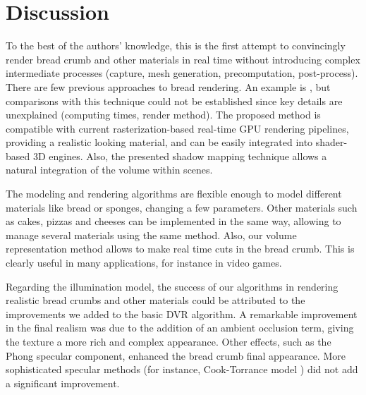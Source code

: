 
\section*{Discussion}


To the best of the authors' knowledge, this is the first attempt to convincingly render bread crumb and other materials in real time without introducing complex intermediate processes (capture, mesh generation, precomputation, post-process).
There are few previous approaches to bread rendering. An example is \cite{Cho2007}, but comparisons with this technique could not be established since key details are unexplained (computing times, render method).
The proposed method is compatible with current rasterization-based real-time GPU rendering pipelines, providing a realistic looking material, and can be easily integrated into  shader-based 3D engines.
Also, the presented shadow mapping technique allows a natural integration of the volume within scenes. 


The modeling and rendering algorithms are flexible enough to model different materials like bread or sponges, changing a few parameters.
Other materials such as cakes, pizzas and cheeses can be implemented in the same way, allowing to manage several materials using the same method.
Also, our volume representation method allows to make real time cuts in the bread crumb.
This is clearly useful in many applications, for instance in video games.

Regarding the illumination model, the success of our algorithms in rendering realistic bread crumbs and other materials could be attributed to the improvements we added to the basic DVR algorithm.
A remarkable improvement in the final realism was due to the addition of an ambient occlusion term, giving the texture a more rich and complex appearance.
Other effects, such as the Phong specular component, enhanced the bread crumb final appearance.
More sophisticated specular methods (for instance, Cook-Torrance model \cite{Cook1982}) did not add a significant improvement.


